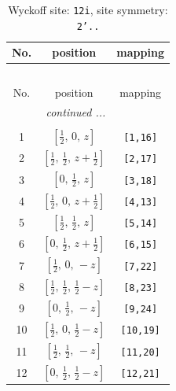 \documentclass[fleqn,8pt]{jsarticle}
\begin{document}
\begin{longtable}{ccc}
\caption{Wyckoff site: {\tt 12i}, site symmetry: {\tt 2'..}}
 \\
 \hline \hline
No. & position & mapping \\ \hline \endfirsthead

\multicolumn{2}{l}{\tablename\ \thetable{}} \\
 \hline \hline
No. & position & mapping \\ \hline \endhead

 \hline \hline
\multicolumn{2}{r}{\footnotesize\it continued ...} \\ \endfoot

 \hline \hline
\multicolumn{2}{r}{} \\ \endlastfoot

1 & $\left[ \frac{1}{2},\, 0,\, z \right]$ & {\tt [1,16]} \\ \hline
2 & $\left[ \frac{1}{2},\, \frac{1}{2},\, z + \frac{1}{2} \right]$ & {\tt [2,17]} \\ \hline
3 & $\left[ 0,\, \frac{1}{2},\, z \right]$ & {\tt [3,18]} \\ \hline
4 & $\left[ \frac{1}{2},\, 0,\, z + \frac{1}{2} \right]$ & {\tt [4,13]} \\ \hline
5 & $\left[ \frac{1}{2},\, \frac{1}{2},\, z \right]$ & {\tt [5,14]} \\ \hline
6 & $\left[ 0,\, \frac{1}{2},\, z + \frac{1}{2} \right]$ & {\tt [6,15]} \\ \hline
7 & $\left[ \frac{1}{2},\, 0,\, - z \right]$ & {\tt [7,22]} \\ \hline
8 & $\left[ \frac{1}{2},\, \frac{1}{2},\, \frac{1}{2} - z \right]$ & {\tt [8,23]} \\ \hline
9 & $\left[ 0,\, \frac{1}{2},\, - z \right]$ & {\tt [9,24]} \\ \hline
10 & $\left[ \frac{1}{2},\, 0,\, \frac{1}{2} - z \right]$ & {\tt [10,19]} \\ \hline
11 & $\left[ \frac{1}{2},\, \frac{1}{2},\, - z \right]$ & {\tt [11,20]} \\ \hline
12 & $\left[ 0,\, \frac{1}{2},\, \frac{1}{2} - z \right]$ & {\tt [12,21]} \\
\end{longtable}
\renewcommand{\arraystretch}{1.2}
\end{document}
